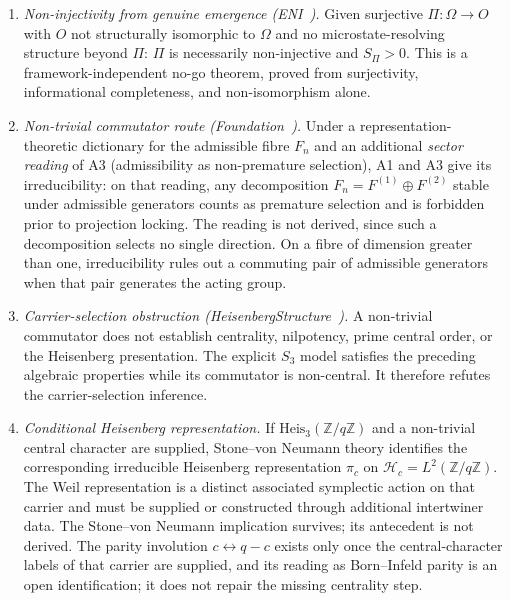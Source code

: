 \documentclass[11pt,a4paper]{article}
\theoremstyle{definition}
\newcommand{\Heis}{\mathrm{Heis}}
\newcommand{\SPI}{S_\Pi}
\newcommand{\Hc}{\mathcal{H}_c}
\newcommand{\pic}{\pi_c}
\begin{document}
    \begin{enumerate}
      \item \textit{Non-injectivity from genuine emergence (ENI~\cite{Beau2026l}).}
      Given surjective $\Pi : \Omega \to O$ with $O$ not structurally isomorphic to $\Omega$
      and no microstate-resolving structure beyond $\Pi$: $\Pi$ is necessarily non-injective
      and $\SPI > 0$.
      This is a framework-independent no-go theorem, proved from surjectivity, informational
      completeness, and non-isomorphism alone.

      \item \textit{Non-trivial commutator route (Foundation~\cite{Beau2026m}).}
      Under a representation-theoretic dictionary for the admissible fibre $F_n$ and an additional
      \emph{sector reading} of A3 (admissibility as non-premature selection), A1 and A3 give its
      irreducibility: on that reading, any decomposition $F_n = F^{(1)} \oplus F^{(2)}$ stable under
      admissible generators counts as premature selection and is forbidden prior to projection locking.
      The reading is not derived, since such a decomposition selects no single direction.
      On a fibre of dimension greater than one, irreducibility rules out a commuting pair of
      admissible generators when that pair generates the acting group.

      \item \textit{Carrier-selection obstruction
      (HeisenbergStructure~\cite{Beau2026HeisenbergStructure}).}
      A non-trivial commutator does not establish centrality, nilpotency, prime central order,
      or the Heisenberg presentation.  The explicit $S_3$ model satisfies the preceding
      algebraic properties while its commutator is non-central.  It therefore refutes the
      carrier-selection inference.

      \item \textit{Conditional Heisenberg representation.}
      If $\Heis_3(\mathbb{Z}/q\mathbb{Z})$ and a non-trivial central character are supplied,
      Stone--von Neumann theory identifies the corresponding irreducible Heisenberg representation
      $\pic$ on $\Hc=L^2(\mathbb{Z}/q\mathbb{Z})$. The Weil representation is a distinct associated
      symplectic action on that carrier and must be supplied or constructed through additional
      intertwiner data. The Stone--von Neumann implication survives; its antecedent is not derived.
      The parity involution $c \leftrightarrow q-c$ exists only once the central-character labels
      of that carrier are supplied, and its reading as Born--Infeld parity is an open identification;
      it does not repair the missing centrality step.
    \end{enumerate}
\end{document}
